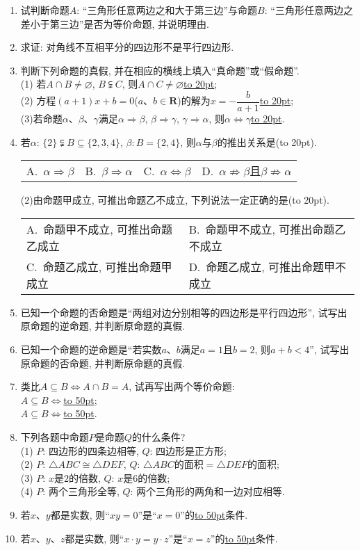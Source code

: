 \documentclass[10pt,a4paper]{article}
\newcommand{\blank}[1]{\underline{\hbox to #1pt{}}}
\newcommand{\bracket}[1]{(\hbox to #1pt{})}
\newcommand{\twoch}[4]{\par\begin{tabular}{p{.46\textwidth}p{.46\textwidth}}
A.~#1& B.~#2\\
C.~#3& D.~#4
\end{tabular}}
\newcommand{\fourch}[4]{\par\begin{tabular}{p{.23\textwidth}p{.23\textwidth}p{.23\textwidth}p{.23\textwidth}}
A.~#1 &B.~#2& C.~#3& D.~#4
\end{tabular}}
\begin{document}
\begin{enumerate}[1.]
\item 试判断命题$A$: ``三角形任意两边之和大于第三边''与命题$B$: ``三角形任意两边之差小于第三边''是否为等价命题, 并说明理由.
\item 求证: 对角线不互相平分的四边形不是平行四边形.
\item 判断下列命题的真假, 并在相应的横线上填入``真命题''或``假命题''.\\
(1) 若$A\cap B\ne \varnothing$, $B\subsetneqq C$, 则$A\cap C\ne \varnothing$\blank{20};\\
(2) 方程$(a+1)x+b=0$($a$、$b\in \mathbf{R}$)的解为$x=-\dfrac b{a+1}$\blank{20};\\
(3)若命题$\alpha$、$\beta$、$\gamma$满足$\alpha \Rightarrow \beta$, $\beta \Rightarrow \gamma$, $\gamma \Rightarrow \alpha$, 则$\alpha \Leftrightarrow \gamma$\blank{20}.
\item 若$\alpha$: $\{2\}\subsetneqq B\subseteq \{2,3,4\}$, $\beta :B=\{2,4\}$, 则$\alpha$与$\beta$的推出关系是\bracket{20}.
\fourch{$\alpha \Rightarrow \beta$}{$\beta \Rightarrow \alpha$}{$\alpha \Leftrightarrow \beta$}{$\alpha \not\Rightarrow \beta$且$\beta \not\Rightarrow \alpha$}
(2)由命题甲成立, 可推出命题乙不成立, 下列说法一定正确的是\bracket{20}.
\twoch{命题甲不成立, 可推出命题乙成立}{命题甲不成立, 可推出命题乙不成立}{命题乙成立, 可推出命题甲成立}{命题乙成立, 可推出命题甲不成立}
\item 已知一个命题的否命题是``两组对边分别相等的四边形是平行四边形'', 试写出原命题的逆命题, 并判断原命题的真假.
\item 已知一个命题的逆命题是``若实数$a$、$b$满足$a=1$且$b=2$, 则$a+b<4$'', 试写出原命题的否命题, 并判断原命题的真假.
\item 类比$A\subseteq B\Leftrightarrow A\cap B=A$, 试再写出两个等价命题:\\
$A\subseteq B\Leftrightarrow$\blank{50};\\
$A\subseteq B\Leftrightarrow$\blank{50}.
\item 下列各题中命题$P$是命题$Q$的什么条件?\\
(1) $P$: 四边形的四条边相等, $Q$: 四边形是正方形;\\
(2) $P$: $\triangle ABC\cong \triangle DEF$,	$Q$: $\triangle ABC$的面积$=\triangle DEF$的面积;\\
(3) $P$: $x$是$2$的倍数, $Q$: $x$是$6$的倍数;\\
(4) $P$: 两个三角形全等, $Q$: 两个三角形的两角和一边对应相等.
\item 若$x$、$y$都是实数, 则``$xy=0$''是``$x=0$''的\blank{50}条件.
\item 若$x$、$y$、$z$都是实数, 则``$x\cdot y=y\cdot z$''是``$x=z$''的\blank{50}条件.

\end{enumerate}
\end{document}
